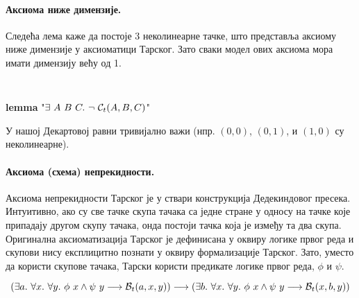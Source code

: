 \paragraph{Аксиома ниже димензије.}
Следећа лема каже да постоје 3 неколинеарне тачке, што представља
аксиому ниже димензије у аксиоматици Тарског. Зато сваки модел ових
аксиома мора имати димензију већу од 1.  
 {\tt
\begin{tabbing}
\textbf{lemma} "$\exists\ A\ B\ C.\ \neg\ \colint{A}{B}{C}$"
\end{tabbing}
}
\noindent У нашој Декартовој равни тривијално важи (нпр. $(0, 0)$,
$(0, 1)$, и $(1, 0)$ су неколинеарне).

\paragraph{Аксиома (схема) непрекидности.}

Аксиома непрекидности Тарског је у ствари конструкција Дедекиндовог
пресека. Интуитивно, ако су све тачке скупа тачака са једне стране у
односу на тачке које припадају другом скупу тачака, онда постоји
тачка која је између та два скупа. Оригинална аксиоматизација Тарског
је дефинисана у оквиру логике првог реда и скупови нису експлицитно
познати у оквиру формализације Тарског. Зато, уместо да користи
скупове тачака, Тарски користи предикате логике првог реда, $\phi$ и
$\psi$.

$$(\exists a.\ \forall x.\ \forall y.\ \phi\ x \wedge \psi\ y \longrightarrow \bett{a}{x}{y}) \longrightarrow (\exists b.\ \forall x.\ \forall y.\ \phi\ x \wedge \psi\ y \longrightarrow \bett{x}{b}{y})$$

